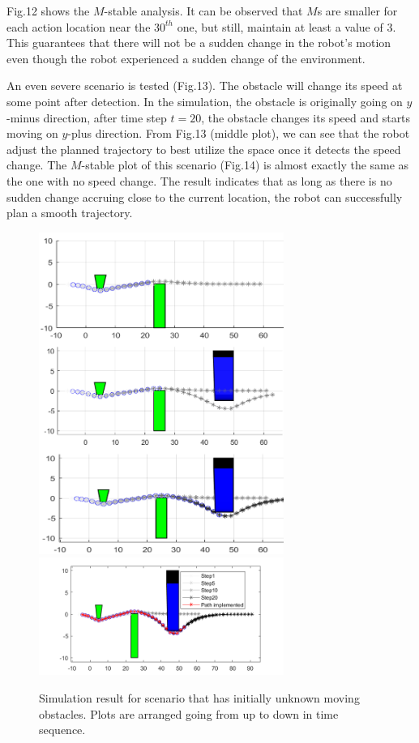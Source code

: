 \documentclass{ifacconf}
\begin{document}
Fig.12 shows the $M$-stable analysis. It can be observed that $M$s are smaller for each action location near the $30^{th}$ one, but still, maintain at least a value of 3. This guarantees that there will not be a sudden change in the robot's motion even though the robot experienced a sudden change of the environment.

An even severe scenario is tested (Fig.13). The obstacle will change its speed at some point after detection. In the simulation, the obstacle is originally going on $y$-minus direction, after time step $t=20$, the obstacle changes its speed and starts moving on $y$-plus direction. From Fig.13 (middle plot), we can see that the robot adjust the planned trajectory to best utilize the space once it detects the speed change. The $M$-stable plot of this scenario (Fig.14) is almost exactly the same as the one with no speed change. The result indicates that as long as there is no sudden change accruing close to the current location, the robot can successfully plan a smooth trajectory.

\begin{figure}[htbp]
\begin{center}
\includegraphics[width=8cm]{src/3_1_1.png}
\includegraphics[width=8cm]{src/3_1_4.png}
\caption{Simulation result for scenario that has initially unknown moving obstacles. Plots are arranged going from up to down in time sequence.}
\label{fig: mpc}
\end{center}
\end{figure}
\end{document}
